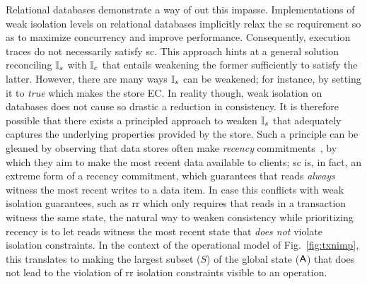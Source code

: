 Relational databases demonstrate a way of out this impasse.
Implementations of weak isolation levels on relational databases
implicitly relax the {\sc sc} requirement so as to maximize
concurrency and improve performance. Consequently, execution traces do
not necessarily satisfy {\sc sc}. This approach hints at a general
solution reconciling $\mathbb{I}_s$ with $\mathbb{I}_c$ that entails weakening the
former sufficiently to satisfy the latter. However, there are many
ways $\mathbb{I}_s$ can be weakened; for instance, by setting it to \emph{true}
which makes the store EC. In reality though, weak isolation on
databases does not cause so drastic a reduction in consistency. It is
therefore possible that there exists a principled approach to weaken
$\mathbb{I}_s$ that adequately captures the underlying properties provided by the store. Such
a principle can be gleaned by observing that data stores often make
\emph{recency} commitments~\cite{bailishat}, by which they aim to make
the most recent data available to clients; {\sc sc} is, in fact, an
extreme form of a recency commitment, which guarantees that reads
\emph{always} witness the most recent writes to a data item. In case this conflicts
with weak isolation guarantees, such as {\sc rr} which only requires that
reads in a transaction witness the same state, the natural way to
weaken consistency while prioritizing recency is to let reads witness
the most recent state that \emph{does not} violate isolation
constraints. In the context of the operational model of
Fig.~\ref{fig:txnimp}, this translates to making the largest subset
($S$) of the global state ($\textsf{A}$) that does not lead to the violation
of {\sc rr} isolation constraints visible to an operation.

